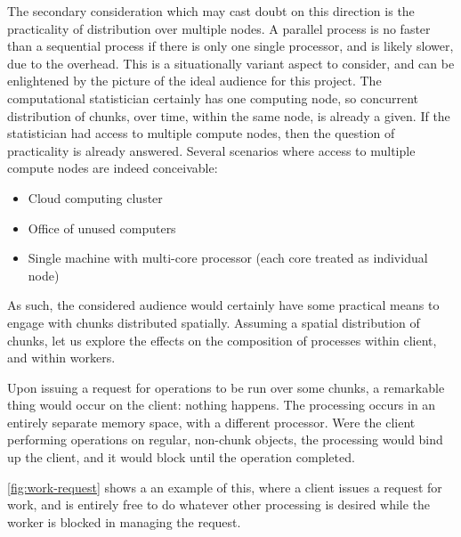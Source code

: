 The secondary consideration which may cast doubt on this direction is
the practicality of distribution over multiple nodes. A parallel process
is no faster than a sequential process if there is only one single
processor, and is likely slower, due to the overhead. This is a
situationally variant aspect to consider, and can be enlightened by the
picture of the ideal audience for this project. The computational
statistician certainly has one computing node, so concurrent
distribution of chunks, over time, within the same node, is already a
given. If the statistician had access to multiple compute nodes, then
the question of practicality is already answered. Several scenarios
where access to multiple compute nodes are indeed conceivable:

\begin{itemize}
  \item
        Cloud computing cluster
  \item
        Office of unused computers
  \item
        Single machine with multi-core processor (each core treated as
        individual node)
\end{itemize}

As such, the considered audience would certainly have some practical
means to engage with chunks distributed spatially. Assuming a spatial
distribution of chunks, let us explore the effects on the composition of
processes within client, and within workers.

Upon issuing a request for operations to be run over some chunks, a
remarkable thing would occur on the client: nothing happens. The
processing occurs in an entirely separate memory space, with a different
processor. Were the client performing operations on regular, non-chunk
objects, the processing would bind up the client, and it would block
until the operation completed.

\cref{fig:work-request} shows a an example of this, where a client issues
a request for work, and is entirely free to do whatever other processing
is desired while the worker is blocked in managing the request.


